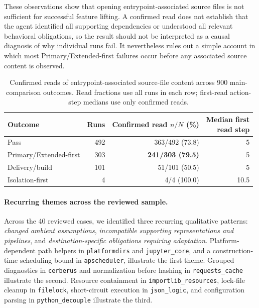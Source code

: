 \documentclass[acmsmall,screen,review,anonymous]{acmart}
\begin{document}
These observations show that opening entrypoint-associated source files is not
sufficient for successful feature lifting. A confirmed read does not establish
that the agent identified all supporting dependencies or understood all relevant
behavioral obligations, so the result should not be interpreted as a causal diagnosis
of why individual runs fail. It nevertheless rules out a simple account in
which most Primary/Extended-first failures occur before any associated source content is
observed.

\begin{table}[htbp]
  \centering
    \caption{Confirmed reads of entrypoint-associated source-file content across
    900 main-comparison outcomes. Read fractions use all runs in each row;
    first-read action-step medians use only confirmed reads.}
    \label{tab:source-exposure}

    \centering
    \footnotesize

    \begin{tabular}{@{}lrrr@{}}
      \toprule
      Outcome
        & Runs
        & \shortstack{Confirmed read\\$n/N$ (\%)}
        & \shortstack{Median first\\read step} \\
      \midrule
      Pass & 492 & 363/492 (73.8) & 5 \\
      Primary/Extended-first & 303 & \textbf{241/303 (79.5)} & 5 \\
      Delivery/build & 101 & 51/101 (50.5) & 5 \\
      Isolation-first & 4 & 4/4 (100.0) & 10.5 \\

      \bottomrule
    \end{tabular}

\end{table}

\paragraph{Recurring themes across the reviewed sample.}
Across the 40 reviewed cases, we identified three recurring qualitative
patterns:
\emph{changed ambient assumptions}, \emph{incompatible supporting representations
and pipelines}, and \emph{destination-specific obligations requiring adaptation}.
Platform-dependent path helpers in \texttt{platformdirs} and
\texttt{jupyter\_core}, and a construction-time scheduling bound in
\texttt{apscheduler}, illustrate the first theme. Grouped diagnostics in
\texttt{cerberus} and normalization before hashing in \texttt{requests\_cache}
illustrate the second. Resource containment in \texttt{importlib\_resources},
lock-file cleanup in \texttt{filelock}, short-circuit execution in
\texttt{json\_logic}, and configuration parsing in
\texttt{python\_decouple} illustrate the third.
\end{document}
